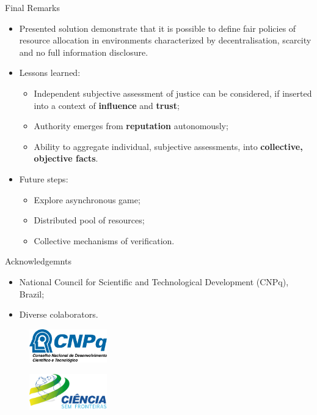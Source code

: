 \begin{frame}{Final Remarks}

\begin{itemize}
\item
  Presented solution demonstrate that it is possible to define
  \alert{fair policies of resource allocation} in environments
  characterized by decentralisation, scarcity and no full information
  disclosure.
\item
  Lessons learned:

  \begin{itemize}
  \tightlist
  \item
    Independent subjective assessment of justice can be considered, if
    inserted into a context of \textbf{influence} and \textbf{trust};
  \item
    Authority emerges from \textbf{reputation} autonomously;
  \item
    Ability to aggregate individual, subjective assessments, into
    \textbf{collective, objective facts}.
  \end{itemize}
\item
  Future steps:

  \begin{itemize}
  \tightlist
  \item
    Explore asynchronous game;
  \item
    Distributed pool of resources;
  \item
    Collective mechanisms of verification.
  \end{itemize}
\end{itemize}

\end{frame}

\begin{frame}{Acknowledgemnts}

\begin{itemize}
\item
  National Council for Scientific and Technological Development (CNPq),
  Brazil;
\item
  Diverse colaborators.
\end{itemize}

\begin{figure}
\centering
\includegraphics[width=0.3\textwidth]{cnpq.png}
\end{figure}

\begin{figure}
\centering
\includegraphics[width=0.3\textwidth]{csf.png}
\end{figure}

\end{frame}
